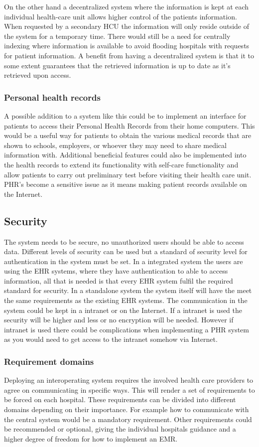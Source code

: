 \documentclass[14pt]{article}
\begin{document}
On the other hand a decentralized system where the information is kept at each individual health-care unit allows higher control of the patients information. When requested by a secondary HCU the information will only reside outside of the system for a temporary time. There would still be a need for centrally indexing where information is available to avoid flooding hospitals with requests for patient information. A benefit from having a decentralized system is that it to some extent guarantees that the retrieved information is up to date as it’s retrieved upon access.

\subsubsection{Personal health records}
A possible addition to a system like this could be to implement an interface for patients to access their Personal Health Records from their home computers. This would be a useful way for patients to obtain the various medical records that are shown to schools, employers, or whoever they may need to share medical information with. Additional beneficial features could also be implemented into the health records to extend its functionality with self-care functionality and allow patients to carry out preliminary test before visiting their health care unit. PHR’s become a sensitive issue as it means making patient records available on the Internet.

\subsection{Security}
The system needs to be secure, no unauthorized users should be able to access data. Different levels of security can be used but a standard of security level for authentication in the system must be set. In a integrated system the users are using the EHR systems, where they have authentication to able to access information, all that is needed is that every EHR system fulfil the required standard for security. In a standalone system the system itself will have the meet the same requirements as the existing EHR systems. 
The communication in the system could be kept in a intranet or on the Internet. If a intranet is used the security will be higher and less or no encryption will be needed. However if intranet is used there could be complications when implementing a PHR system as you would need to get access to the intranet somehow via Internet.

\subsubsection{Requirement domains}
Deploying an interoperating system requires the involved health care providers to agree on communicating in specific ways. This will render a set of requirements to be forced on each hospital. These requirements can be divided into different domains depending on their importance. For example how to communicate with the central system would be a mandatory requirement. Other requirements could be recommended or optional, giving the individual hospitals guidance and a higher degree of freedom for how to implement an EMR.
\end{document}
